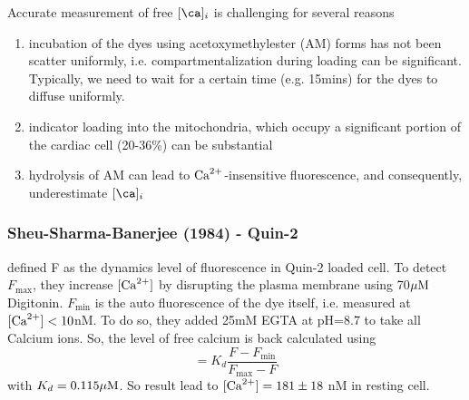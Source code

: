 %

Accurate measurement of free $[\ca]_i$ is challenging for several
reasons~\citep{bassani1995a}
\begin{enumerate}
\item incubation of the dyes using
acetoxymethylester (AM) forms has not been scatter uniformly, i.e.
compartmentalization during loading can be significant. Typically, we need to
wait for a certain time (e.g. 15mins) for the dyes to diffuse uniformly.

\item indicator loading into the mitochondria, which occupy a
  significant portion of the cardiac cell (20-36\%) can be
  substantial

\item hydrolysis of AM can lead to ${\text{Ca}^{2+}}$-insensitive fluorescence, and
  consequently, underestimate $[\ca]_i$
\end{enumerate}


%

\subsubsection{Sheu-Sharma-Banerjee (1984) - Quin-2}
\label{sec:calibrate_Quin2}

\citep{sheu1984} defined F as the dynamics level of fluorescence in Quin-2
loaded cell. To detect $F_\max$, they increase $[{\text{Ca}^{2+}}]$ by disrupting the plasma
membrane using 70${\mu\text{M}}$ Digitonin. $F_\min$ is the auto fluorescence of the dye
itself, i.e. measured at $[{\text{Ca}^{2+}}] < 10$nM. To do so, they added 25mM EGTA at
pH=8.7 to take all Calcium ions. So, the level of free calcium is back
calculated using
\begin{equation}
[\Ca]  = K_d \frac{F - F_\min}{F_\max - F}
\end{equation}
with $K_d = 0.115{\mu\text{M}}$. So result lead to $[{\text{Ca}^{2+}}] = 181\pm 18$ nM in resting
cell.

